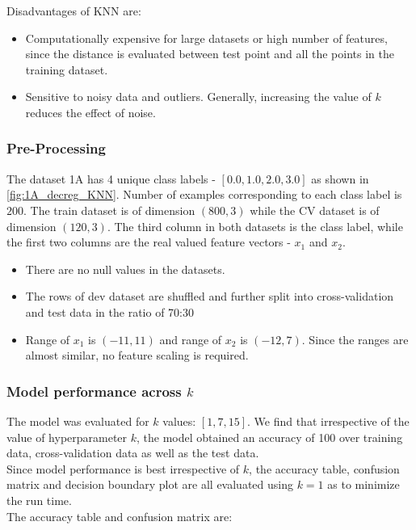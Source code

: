 \documentclass[11pt,a4paper]{article}
\newcommand{\noi}{\noindent}
\begin{document}
\noi
Disadvantages of KNN are:
\begin{itemize}
    \itemsep0em
    \item Computationally expensive for large datasets or high number of features, since the distance is evaluated between test point and all the points in the training dataset. 
    \item Sensitive to noisy data and outliers. Generally, increasing the value of $k$ reduces the effect of noise.
\end{itemize}

\subsubsection{Pre-Processing}
\label{sec:1_1_1}
The dataset 1A has 4 unique class labels - $[0.0, 1.0, 2.0, 3.0]$ as shown in \autoref{fig:1A_decreg_KNN}. Number of examples corresponding to each class label is $200$.
The train dataset is of dimension $(800,3)$ while the CV dataset is of dimension $(120,3)$. The third column in both datasets is the class label, while the first two columns are the real valued feature vectors - $x_1$ and $x_2$.
\begin{itemize}
    \itemsep0em
    \item There are no null values in the datasets. 
    \item The rows of dev dataset are shuffled and further split into cross-validation and test data in the ratio of 70:30
    \item Range of $x_1$ is $(-11,11)$ and range of $x_2$ is $(-12,7)$. Since the ranges are almost similar, no feature scaling is required.  
\end{itemize}

\subsubsection{Model performance across $k$}
The model was evaluated for $k$ values: $[1,7,15]$. We find that irrespective of the value of hyperparameter $k$, the model obtained an accuracy of 100 over training data, cross-validation data as well as the test data. \\

\noi
Since model performance is best irrespective of $k$, the accuracy table, confusion matrix and decision boundary plot are all evaluated using $k=1$ as to minimize the run time.\\

\noi
The accuracy table and confusion matrix are: 

\end{document}
